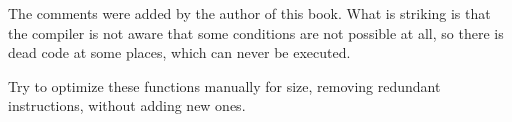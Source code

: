 




The comments were added by the author of this book.
What is striking is that the compiler is not aware that some conditions are not possible at all,
so there is dead code at some places, which can never be executed.

\mysubparagraph{\Exercise}

Try to optimize these functions manually for size, removing redundant instructions, without adding new ones.

